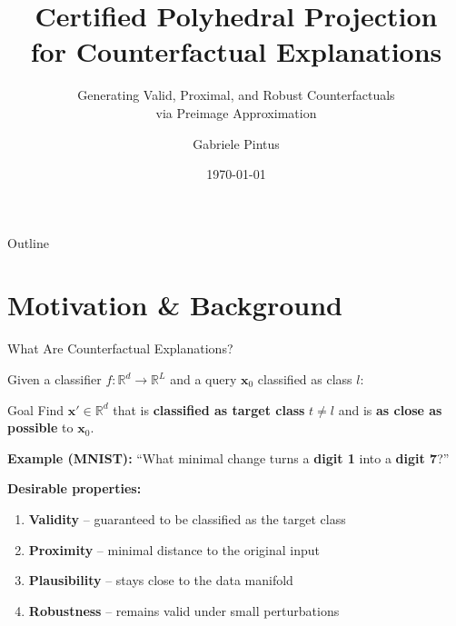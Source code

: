 \documentclass[aspectratio=169, 10pt]{beamer}
\title[CPP Counterfactuals]{%
  Certified Polyhedral Projection\\[4pt]
  for Counterfactual Explanations}
\subtitle{Generating Valid, Proximal, and Robust Counterfactuals\\via Preimage Approximation}
\author{Gabriele Pintus}
\date{\today}
\newcommand{\vx}{\mathbf{x}}
\newcommand{\R}{\mathbb{R}}
\begin{document}
\begin{frame}
  \titlepage
\end{frame}

\begin{frame}{Outline}
  \tableofcontents
\end{frame}

\section{Motivation \& Background}

\begin{frame}{What Are Counterfactual Explanations?}

Given a classifier $f: \R^d \to \R^L$ and a query $\vx_0$ classified as class $l$:

\begin{block}{Goal}
  Find $\vx' \in \R^d$ that is \textbf{classified as target class} $t \neq l$ and is \textbf{as close as possible} to $\vx_0$.
\end{block}

\bigskip

\textbf{Example (MNIST):} ``What minimal change turns a \textbf{digit 1} into a \textbf{digit 7}?''

\bigskip

\textbf{Desirable properties:}
\begin{enumerate}
  \item \textbf{Validity} -- guaranteed to be classified as the target class
  \item \textbf{Proximity} -- minimal distance to the original input
  \item \textbf{Plausibility} -- stays close to the data manifold
  \item \textbf{Robustness} -- remains valid under small perturbations
\end{enumerate}

\end{frame}
\end{document}
